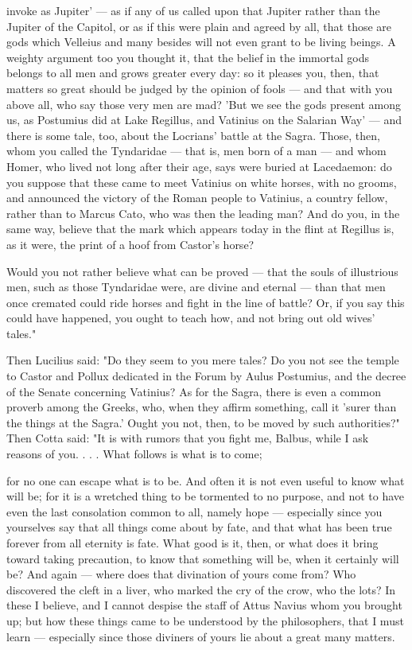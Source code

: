  invoke as Jupiter' — as if any of us called upon that Jupiter rather than the Jupiter of the Capitol, or as if this were plain and agreed by all, that those are gods which Velleius and many besides will not even grant to be living beings. A weighty argument too you thought it, that the belief in the immortal gods belongs to all men and grows greater every day: so it pleases you, then, that matters so great should be judged by the opinion of fools — and that with you above all, who say those very men are mad? 'But we see the gods present among us, as Postumius did at Lake Regillus, and Vatinius on the Salarian Way' — and there is some tale, too, about the Locrians' battle at the Sagra. Those, then, whom you called the Tyndaridae — that is, men born of a man — and whom Homer, who lived not long after their age, says were buried at Lacedaemon: do you suppose that these came to meet Vatinius on white horses, with no grooms, and announced the victory of the Roman people to Vatinius, a country fellow, rather than to Marcus Cato, who was then the leading man? And do you, in the same way, believe that the mark which appears today in the flint at Regillus is, as it were, the print of a hoof from Castor's horse?

 Would you not rather believe what can be proved — that the souls of illustrious men, such as those Tyndaridae were, are divine and eternal — than that men once cremated could ride horses and fight in the line of battle? Or, if you say this could have happened, you ought to teach how, and not bring out old wives' tales."

 Then Lucilius said: "Do they seem to you mere tales? Do you not see the temple to Castor and Pollux dedicated in the Forum by Aulus Postumius, and the decree of the Senate concerning Vatinius? As for the Sagra, there is even a common proverb among the Greeks, who, when they affirm something, call it 'surer than the things at the Sagra.' Ought you not, then, to be moved by such authorities?" Then Cotta said: "It is with rumors that you fight me, Balbus, while I ask reasons of you. . . . What follows is what is to come;

 for no one can escape what is to be. And often it is not even useful to know what will be; for it is a wretched thing to be tormented to no purpose, and not to have even the last consolation common to all, namely hope — especially since you yourselves say that all things come about by fate, and that what has been true forever from all eternity is fate. What good is it, then, or what does it bring toward taking precaution, to know that something will be, when it certainly will be? And again — where does that divination of yours come from? Who discovered the cleft in a liver, who marked the cry of the crow, who the lots? In these I believe, and I cannot despise the staff of Attus Navius whom you brought up; but how these things came to be understood by the philosophers, that I must learn — especially since those diviners of yours lie about a great many matters.

